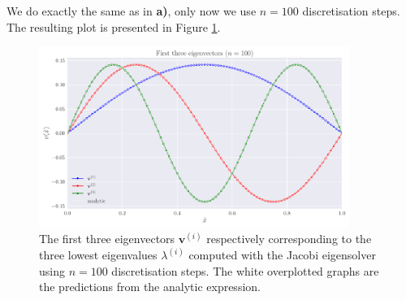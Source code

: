 \documentclass[english,notitlepage,nofootinbib]{revtex4-1}  %
\renewcommand{\vec}{\mathbf}
\begin{document}
We do exactly the same as in \textbf{a)}, only now we use $n=100$ discretisation steps. The resulting plot is presented in Figure \ref{fig:p6_solution100steps}.

\begin{figure}[h!]
    \centering
    \includegraphics[width=0.9\textwidth]{solution_100steps.pdf}
    \caption{The first three eigenvectors $\vec{v}^{(i)}$ respectively corresponding to the three lowest eigenvalues $\lambda^{(i)}$ computed with the Jacobi eigensolver using $n=100$ discretisation steps. The white overplotted graphs are the predictions from the analytic expression.}\label{fig:p6_solution100steps}
\end{figure}

   
\end{document}
